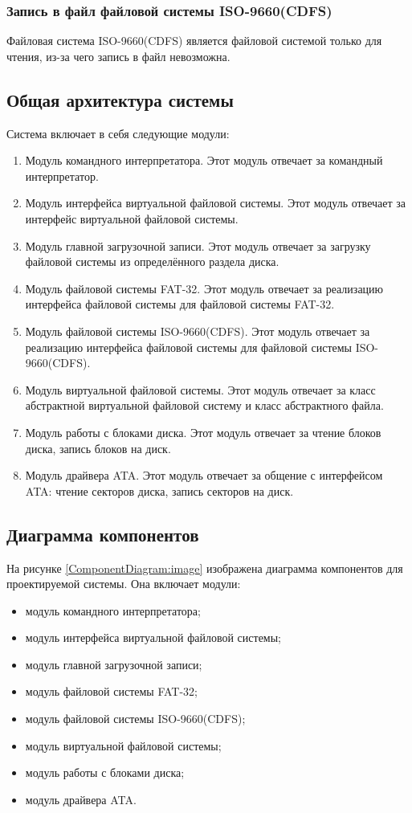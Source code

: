 \subsubsection{Запись в файл файловой системы ISO-9660(CDFS)}

Файловая система ISO-9660(CDFS) является файловой системой только для чтения, из-за чего запись в файл невозможна.

\subsection{Общая архитектура системы}

Система включает в себя следующие модули:

\begin{enumerate}
\item Модуль командного интерпретатора. Этот модуль отвечает за командный интерпретатор.
\item Модуль интерфейса виртуальной файловой системы. Этот модуль отвечает за интерфейс виртуальной файловой системы.
\item Модуль главной загрузочной записи. Этот модуль отвечает за загрузку файловой системы из определённого раздела диска.
\item Модуль файловой системы FAT-32. Этот модуль отвечает за реализацию интерфейса файловой системы для файловой системы FAT-32.
\item Модуль файловой системы ISO-9660(CDFS). Этот модуль отвечает за реализацию интерфейса файловой системы для файловой системы ISO-9660(CDFS).
\item Модуль виртуальной файловой системы. Этот модуль отвечает за класс абстрактной виртуальной файловой систему и класс абстрактного файла.
\item Модуль работы с блоками диска. Этот модуль отвечает за чтение блоков диска, запись блоков на диск.
\item Модуль драйвера ATA. Этот модуль отвечает за общение с интерфейсом ATA: чтение секторов диска, запись секторов на диск.
\end{enumerate}

\subsection{Диаграмма компонентов}

На рисунке \ref{ComponentDiagram:image} изображена диаграмма компонентов для проектируемой
системы. Она включает модули:

\begin{itemize}
\item модуль командного интерпретатора;
\item модуль интерфейса виртуальной файловой системы;
\item модуль главной загрузочной записи;
\item модуль файловой системы FAT-32;
\item модуль файловой системы ISO-9660(CDFS);
\item модуль виртуальной файловой системы;
\item модуль работы с блоками диска;
\item модуль драйвера ATA.
\end{itemize}

